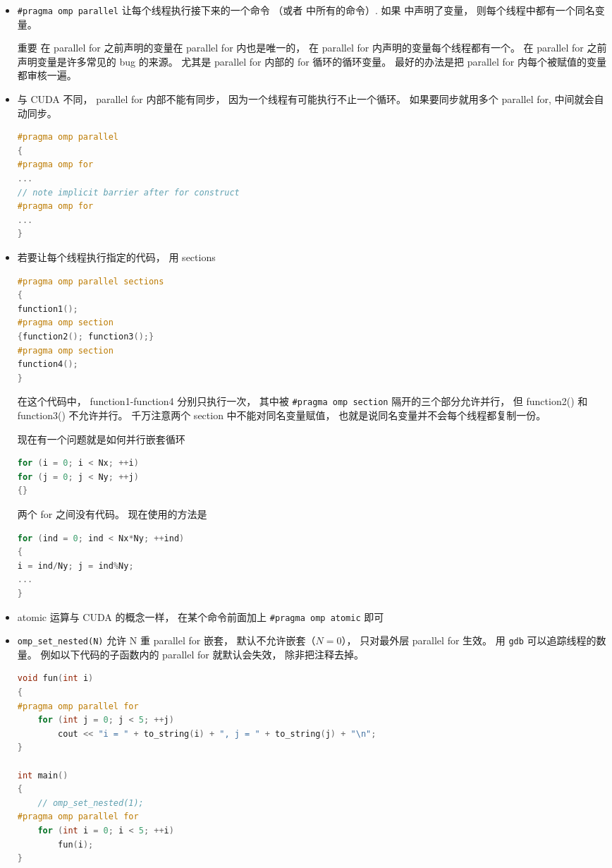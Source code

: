\begin{itemize}
\item \verb|#pragma omp parallel| 让每个线程执行接下来的一个命令 （或者 {} 中所有的命令）. 如果 {} 中声明了变量， 则每个线程中都有一个同名变量。
\item [重要] 在 parallel for 之前声明的变量在 parallel for 内也是唯一的， 在 parallel for 内声明的变量每个线程都有一个。 在 parallel for 之前声明变量是许多常见的 bug 的来源。 尤其是 parallel for 内部的 for 循环的循环变量。 最好的办法是把 parallel for 内每个被赋值的变量都审核一遍。
\item 与 CUDA 不同， parallel for 内部不能有同步， 因为一个线程有可能执行不止一个循环。 如果要同步就用多个 parallel for, 中间就会自动同步。
\begin{lstlisting}[language=cpp]
#pragma omp parallel
{
#pragma omp for
...
// note implicit barrier after for construct
#pragma omp for
...
}
\end{lstlisting}
\item 若要让每个线程执行指定的代码， 用 sections
\begin{lstlisting}[language=cpp]
#pragma omp parallel sections
{
function1();
#pragma omp section
{function2(); function3();}
#pragma omp section
function4();
}
\end{lstlisting}
在这个代码中， function1-function4 分别只执行一次， 其中被 \verb|#pragma omp section| 隔开的三个部分允许并行， 但 function2() 和 function3() 不允许并行。 千万注意两个 section 中不能对同名变量赋值， 也就是说同名变量并不会每个线程都复制一份。

现在有一个问题就是如何并行嵌套循环
\begin{lstlisting}[language=cpp]
for (i = 0; i < Nx; ++i)
for (j = 0; j < Ny; ++j)
{}
\end{lstlisting}
两个 for 之间没有代码。 现在使用的方法是
\begin{lstlisting}[language=cpp]
for (ind = 0; ind < Nx*Ny; ++ind)
{
i = ind/Ny; j = ind%Ny;
...
}
\end{lstlisting}
\item atomic 运算与 CUDA 的概念一样， 在某个命令前面加上 \verb|#pragma omp atomic| 即可
\item \verb|omp_set_nested(N)| 允许 N 重 parallel for 嵌套， 默认不允许嵌套（$N=0$）， 只对最外层 parallel for 生效。 用 \verb|gdb| 可以追踪线程的数量。 例如以下代码的子函数内的 parallel for 就默认会失效， 除非把注释去掉。
\begin{lstlisting}[language=cpp]
void fun(int i)
{
#pragma omp parallel for
	for (int j = 0; j < 5; ++j)
		cout << "i = " + to_string(i) + ", j = " + to_string(j) + "\n";
}

int main()
{
	// omp_set_nested(1);
#pragma omp parallel for
	for (int i = 0; i < 5; ++i)
		fun(i);
}
\end{lstlisting}
\end{itemize}


